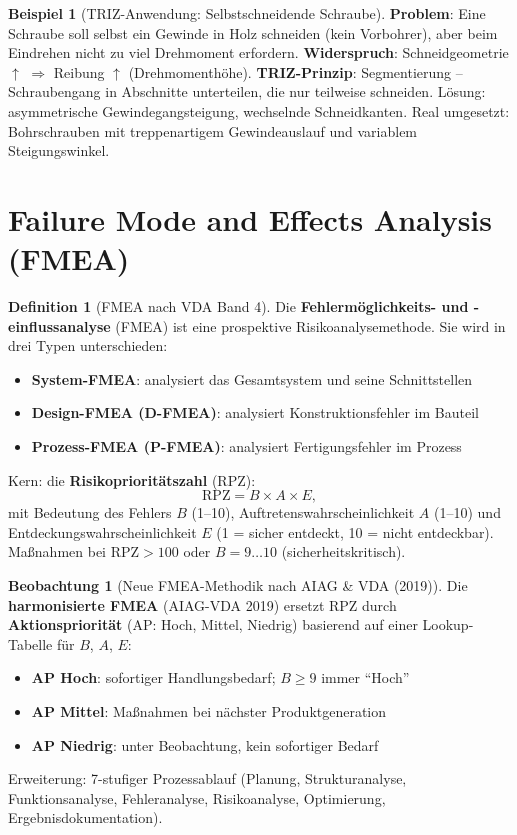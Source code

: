 ﻿\documentclass[a4paper,12pt]{report}
\theoremstyle{definition}
\newtheorem{definition}{Definition}
\newtheorem{beispiel}{Beispiel}
\newtheorem{beobachtung}{Beobachtung}
\begin{document}
\begin{beispiel}[TRIZ-Anwendung: Selbstschneidende Schraube]
\textbf{Problem}: Eine Schraube soll selbst ein Gewinde in Holz schneiden
(kein Vorbohrer), aber beim Eindrehen nicht zu viel Drehmoment erfordern.
\textbf{Widerspruch}: Schneidgeometrie $\uparrow$ $\Rightarrow$ Reibung $\uparrow$ (Drehmomenthöhe).
\textbf{TRIZ-Prinzip}: Segmentierung -- Schraubengang in Abschnitte unterteilen,
die nur teilweise schneiden. Lösung: asymmetrische Gewindegangsteigung,
wechselnde Schneidkanten. Real umgesetzt: Bohrschrauben mit treppenartigem
Gewindeauslauf und variablem Steigungswinkel.
\end{beispiel}

\section{Failure Mode and Effects Analysis (FMEA)}

\begin{definition}[FMEA nach VDA Band 4]
Die \textbf{Fehlermöglichkeits- und -einflussanalyse} (FMEA) ist eine
prospektive Risikoanalysemethode. Sie wird in drei Typen unterschieden:
\begin{itemize}
    \item[-] \textbf{System-FMEA}: analysiert das Gesamtsystem und seine Schnittstellen
    \item[-] \textbf{Design-FMEA (D-FMEA)}: analysiert Konstruktionsfehler im Bauteil
    \item[-] \textbf{Prozess-FMEA (P-FMEA)}: analysiert Fertigungsfehler im Prozess
\end{itemize}
Kern: die \textbf{Risikoprioritätszahl} (RPZ):
\[
  \mathrm{RPZ} = B \times A \times E,
\]
mit Bedeutung des Fehlers $B$ (1--10), Auftretenswahrscheinlichkeit $A$ (1--10)
und Entdeckungswahrscheinlichkeit $E$ (1 = sicher entdeckt, 10 = nicht entdeckbar).
Maßnahmen bei $\mathrm{RPZ} > 100$ oder $B = 9\ldots10$ (sicherheitskritisch).
\end{definition}

\begin{beobachtung}[Neue FMEA-Methodik nach AIAG \& VDA (2019)]
Die \textbf{harmonisierte FMEA} (AIAG-VDA 2019) ersetzt RPZ durch
\textbf{Aktionspriorität} (AP: Hoch, Mittel, Niedrig) basierend auf
einer Lookup-Tabelle für $B$, $A$, $E$:
\begin{itemize}
    \item[-] \textbf{AP Hoch}: sofortiger Handlungsbedarf; $B \ge 9$ immer ``Hoch''
    \item[-] \textbf{AP Mittel}: Maßnahmen bei nächster Produktgeneration
    \item[-] \textbf{AP Niedrig}: unter Beobachtung, kein sofortiger Bedarf
\end{itemize}
Erweiterung: 7-stufiger Prozessablauf (Planung, Strukturanalyse, Funktionsanalyse,
Fehleranalyse, Risikoanalyse, Optimierung, Ergebnisdokumentation).
\end{beobachtung}
\end{document}
